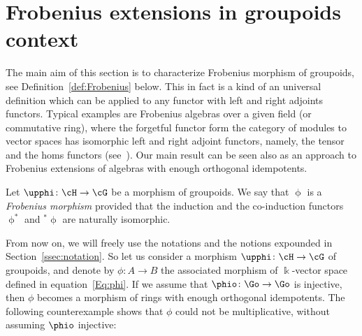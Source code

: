 \section{Frobenius extensions in groupoids context}\label{sec:Frobenius}
The main aim of this section is to characterize Frobenius morphism of groupoids, see Definition~\ref{def:Frobenius} below. This in fact is a kind of an universal definition which can be applied to any functor with left and right adjoints functors. Typical examples are Frobenius algebras over a given field (or commutative ring), where the forgetful functor form the category of modules to vector spaces has isomorphic left and right adjoint functors, namely, the tensor and the homs functors (see~\cite{Kadison:1999}). Our main result can be seen also as an approach to Frobenius extensions of algebras with enough orthogonal idempotents.

\begin{Definition}\label{def:Frobenius}Let $\upphi \colon \cH \to \cG$ be a morphism of groupoids. We say that $\upphi$ is a \emph{Frobenius morphism} provided that the induction and the co-induction functors $\upphi^{*}$ and ${}^{*}\upphi$ are naturally isomorphic.
\end{Definition}

From now on, we will freely use the notations and the notions expounded in Section~\ref{ssec:notation}. So let us consider a morphism $\upphi\colon \cH \to \cG$ of groupoids, and denote by $\phi\colon A \to B$ the associated morphism of $\Bbbk$-vector space defined in equation~\eqref{Eq:phi}. If we assume that $\phio\colon \Go \to \Go$ is injective, then $\phi$ becomes a morphism of rings with enough orthogonal idempotents. The following counterexample shows that $\phi$ could not be multiplicative, without assuming $\phio$ injective:

